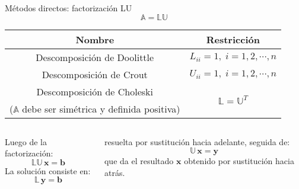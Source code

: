 \documentclass[9pt, aspectratio=169]{beamer}
\begin{document}
\begin{frame}{Métodos directos: factorización LU}
 \begin{equation*}
  \mathbb{A} = \mathbb{L U} 
 \end{equation*}
 
 \begin{center}
\begin{tabular}{c c}
\toprule
\textbf{Nombre} & \textbf{Restricción} \\
\midrule
Descomposición de Doolittle & $L_{ii} = 1, \; i = 1, 2, \cdots,n$ \\
Descomposición de Crout & $U_{ii} = 1, \; i = 1, 2, \cdots,n$ \\
Descomposición de Choleski & \multirow{2}{*}{$\mathbb{L} = \mathbb{U}^T$} \\
{\small ($\mathbb{A}$ debe ser simétrica y definida positiva)} & \\
\bottomrule
\end{tabular} 
\end{center}
\vspace{2em}

\begin{columns}[t]
Luego de la factorización:
\begin{equation*}
 \mathbb{LU} \, \bm{x} = \bm{b}
\end{equation*}
La solución consiste en:
\begin{equation*}
 \mathbb{L} \, \bm{y} = \bm{b}
\end{equation*}

resuelta por sustitución hacia adelante, seguida de:
\begin{equation*}
 \mathbb{U} \, \bm{x} = \bm{y}
\end{equation*}
que da el resultado $\bm{x}$ obtenido por sustitución hacia atrás.
\end{columns}
\end{frame}
\end{document}
